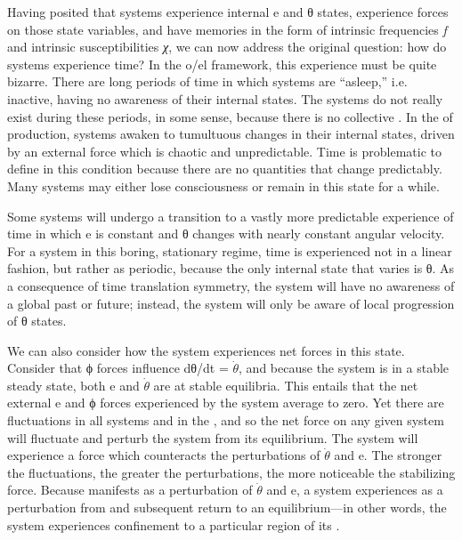   Having posited that systems experience internal e and θ states, experience forces on those state variables, and have memories in the form of intrinsic frequencies \textit{f} and intrinsic susceptibilities \textit{χ}, we can now address the original question: how do systems experience time? In the o/el framework, this experience must be quite bizarre. There are long periods of time in which systems are “asleep,” i.e. inactive, having no awareness of their internal states. The systems do not really exist during these periods, in some sense, because there is no collective . In the  of production, systems awaken to tumultuous changes in their internal states, driven by an external force which is chaotic and unpredictable. Time is problematic to define in this condition because there are no quantities that change predictably. Many systems may either lose consciousness or remain in this state for a while. 

  Some systems will undergo a transition to a vastly more predictable experience of time in which e is constant and θ changes with nearly constant angular velocity. For a system in this boring, stationary regime, time is experienced not in a linear fashion, but rather as periodic, because the only internal state that varies is θ. As a consequence of time translation symmetry, the system will have no awareness of a global past or future; instead, the system will only be aware of local progression of θ states. 

  We can also consider how the system experiences net forces in this state. Consider that ϕ forces influence  dθ/dt = $\dot{\theta}$, and because the system is in a stable steady state, both e and $\dot{\theta}$ are at stable equilibria. This entails that the net external e and ϕ forces experienced by the system average to zero. Yet there are fluctuations in all systems and in the , and so the net force on any given system will fluctuate and perturb the system from its equilibrium. The system will experience a force which counteracts the perturbations of $\dot{\theta}$ and e. The stronger the fluctuations, the greater the perturbations, the more noticeable the stabilizing force. Because  manifests as a perturbation of $\dot{\theta}$ and e, a system experiences  as a perturbation from and subsequent return to an equilibrium—in other words, the system experiences confinement to a particular region of its .

